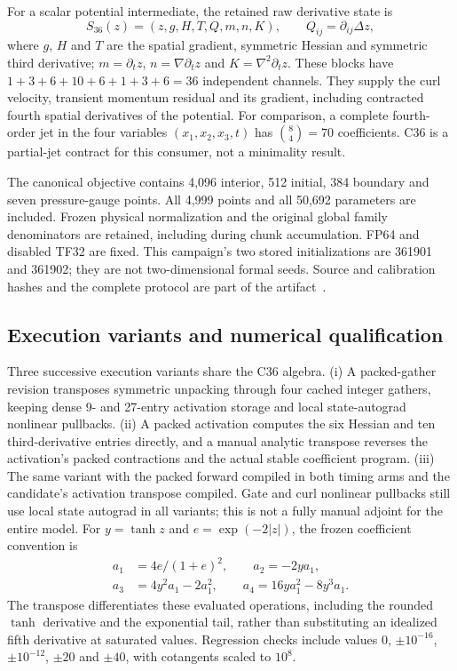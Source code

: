 \documentclass[11pt]{article}
\begin{document}
For a scalar potential intermediate, the retained raw derivative state is
\begin{equation}
S_{36}(z)=(z,g,H,T,Q,m,n,K),\qquad
Q_{ij}=\partial_{ij}\Delta z,
\label{eq:c36state}
\end{equation}
where $g$, $H$ and $T$ are the spatial gradient, symmetric Hessian and
symmetric third derivative; $m=\partial_t z$, $n=\nabla\partial_t z$ and
$K=\nabla^2\partial_t z$. These blocks have
$1+3+6+10+6+1+3+6=36$ independent channels. They supply the curl velocity,
transient momentum residual and its gradient, including contracted fourth
spatial derivatives of the potential. For comparison, a complete
fourth-order jet in the four variables $(x_1,x_2,x_3,t)$ has
$\binom{8}{4}=70$ coefficients. C36 is a partial-jet contract for this
consumer, not a minimality result.

The canonical objective contains 4,096 interior, 512 initial, 384 boundary
and seven pressure-gauge points. All 4,999 points and all 50,692 parameters
are included. Frozen physical normalization and the original global
family denominators are retained, including during chunk accumulation.
FP64 and disabled TF32 are fixed. This campaign's two stored
initializations are 361901 and 361902; they are not two-dimensional formal
seeds. Source and calibration hashes and the complete protocol are part of
the artifact~\cite{flashns3dartifact}.

\subsection{Execution variants and numerical qualification}
Three successive execution variants share the C36 algebra. (i) A
packed-gather revision transposes symmetric unpacking through four cached
integer gathers, keeping dense 9- and 27-entry activation storage and
local state-autograd nonlinear pullbacks. (ii) A packed activation computes
the six Hessian and ten third-derivative entries directly, and a manual
analytic transpose reverses the activation's packed contractions and the
actual stable coefficient program. (iii) The same variant with the packed
forward compiled in both timing arms and the candidate's activation
transpose compiled. Gate and curl nonlinear pullbacks still use local state
autograd in all variants; this is not a fully manual adjoint for the
entire model. For $y=\tanh z$ and $e=\exp(-2|z|)$, the frozen coefficient
convention is
\begin{align}
a_1&=4e/(1+e)^2,\qquad a_2=-2ya_1,\\
a_3&=4y^2a_1-2a_1^2,\qquad
a_4=16ya_1^2-8y^3a_1.
\label{eq:stablec36}
\end{align}
The transpose differentiates these evaluated operations, including the
rounded $\tanh$ derivative and the exponential tail, rather than
substituting an idealized fifth derivative at saturated values. Regression
checks include values 0, $\pm10^{-16}$, $\pm10^{-12}$, $\pm20$ and
$\pm40$, with cotangents scaled to $10^8$.
\end{document}
